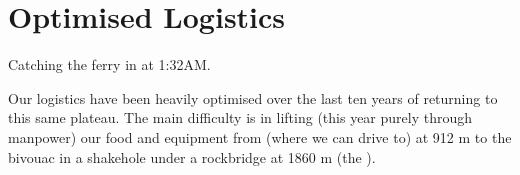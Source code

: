 \section{Optimised Logistics}

\begin{marginfigure}
\checkoddpage \ifoddpage \forcerectofloat \else \forceversofloat \fi
\centering
 \caption{Catching the ferry in \protect{} at 1:32AM. }
 \label{ferry 2009}
\end{marginfigure}

Our logistics have been heavily optimised over the last ten years of
returning to this same plateau. The main difficulty is in lifting (this
year purely through manpower) our food and equipment from  (where we can drive to) at 912 m to the bivouac in a shakehole
under a rockbridge at 1860 m (the ).

